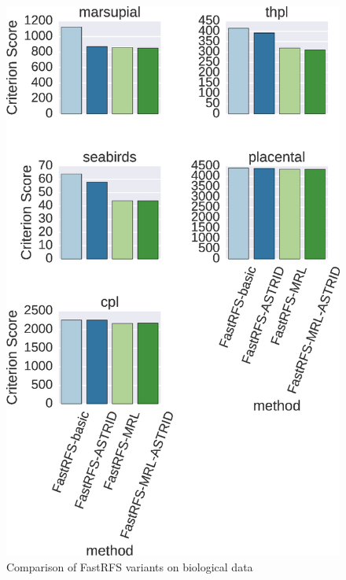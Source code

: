 




 \begin{figure}
   \centering
   \includegraphics[width=\textwidth,height=0.9\textheight,keepaspectratio]{fastrfs-figs/bio-rfscores-fastrfs-comp.eps}
   \caption{Comparison of FastRFS variants on biological data}
   \label{fig:fastrfs-sup::bio-fastrfs-comp}
 \end{figure}
